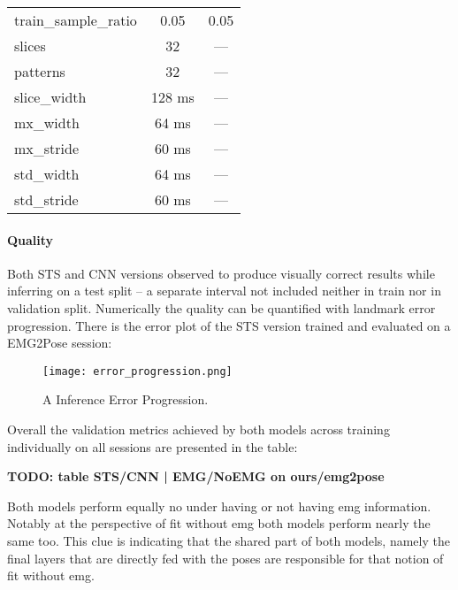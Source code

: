 {\begin{longtable}{l|c|c}
train\_sample\_ratio           & 0.05         & 0.05         \\
slices                         & 32           & ---          \\
patterns                       & 32           & ---          \\
slice\_width                   & 128 ms       & ---          \\
mx\_width                      & 64 ms        & ---          \\
mx\_stride                     & 60 ms        & ---          \\
std\_width                     & 64 ms        & ---          \\
std\_stride                    & 60 ms        & ---          \\
\hline
\end{longtable}
}

\paragraph{Quality}
Both STS and CNN versions observed to produce visually correct results while inferring on a test split -- a separate interval not included neither in train nor in validation split. Numerically the quality can be quantified with landmark error progression. There is the error plot of the STS version trained and evaluated on a EMG2Pose session:

\begin{figure}[H]
    \centering
    \texttt{[image: error\_progression.png]}
    \caption{A Inference Error Progression.}
    \label{fig:error_progression}
\end{figure}

Overall the validation metrics achieved by both models across training individually on all sessions are presented in the table:

\textbf{TODO: table STS/CNN | EMG/NoEMG on ours/emg2pose}

Both models perform equally no under having or not having emg information. Notably at the perspective of fit without emg both models perform nearly the same too. This clue is indicating that the shared part of both models, namely the final layers that are directly fed with the poses are responsible for that notion of fit without emg.

